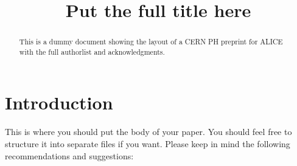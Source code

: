 \documentclass[ALICE,manyauthors]{cernphprep}
\begin{document}


\begin{titlepage}

\title{Put the full title here}


\begin{abstract}
This is a dummy document showing the layout of a CERN PH preprint for ALICE with the full authorlist and acknowledgments. 


\end{abstract}
\end{titlepage}

\setcounter{page}{2} %


\section{Introduction} 

This is where you should put the body of your paper. You should feel free to structure it into separate files if you want. Please keep in mind the following recommendations and suggestions: 
\end{document}

